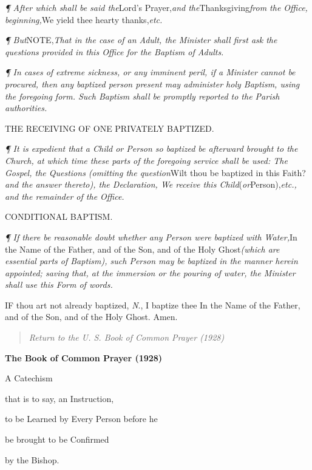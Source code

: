 \emph{¶ After which shall be said the}Lord’s Prayer,\emph{and the}Thanksgiving\emph{from the Office, beginning,}We yield
thee hearty thanks,\emph{etc.}

\emph{¶
But}NOTE,\emph{That in the case of an Adult,
the Minister shall first ask the questions provided in this Office for
the Baptism of Adults.}

\emph{¶ In cases of extreme sickness, or any imminent peril, if a Minister
cannot be procured, then any baptized person present may administer
holy Baptism, using the foregoing form. Such Baptism shall be promptly
reported to the Parish authorities.}

\emph{}

THE
RECEIVING OF ONE PRIVATELY
BAPTIZED.

\emph{¶
It is expedient that a Child or Person so baptized be afterward brought
to the Church, at which time these parts of the foregoing service shall
be used: The Gospel, the Questions (omitting the question}Wilt
thou be baptized in this Faith? \emph{and the answer thereto), the Declaration,
We receive this Child}(\emph{or}Person),\emph{etc., and the remainder
of the Office.}

CONDITIONAL
BAPTISM.

\emph{¶
If there be reasonable doubt whether any Person were baptized with Water,}In the Name of the Father, and of the Son, and of the Holy Ghost\emph{(which are essential parts of Baptism), such Person may be baptized in
the manner herein appointed; saving that, at the immersion or the pouring
of water, the Minister shall use this Form of words.}

IF
thou art not already baptized, \emph{N}., I baptize thee In the Name
of the Father, and of the Son, and of the Holy Ghost. Amen.

\begin{quote}

\emph{Return to the U.
S. Book of Common Prayer (1928)}

\end{quote}


\textbf{The Book of Common Prayer (1928)}

A
Catechism

that
is to say, an Instruction,

to
be Learned by Every Person before he

be
brought to be Confirmed

by
the Bishop.

